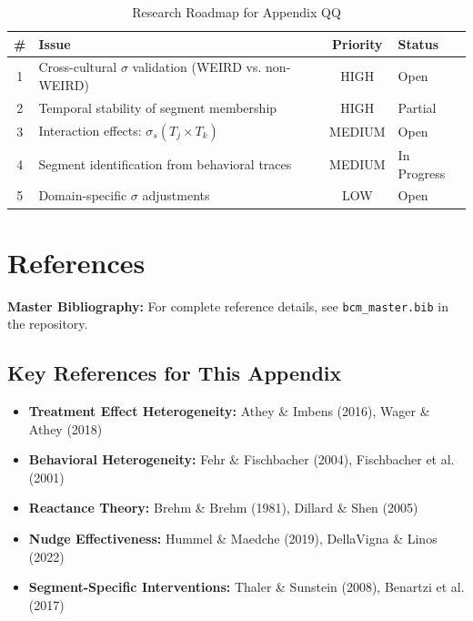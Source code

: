 \begin{table}[htbp]
\centering
\caption{Research Roadmap for Appendix QQ}
\label{tab:qq-roadmap}
\renewcommand{\arraystretch}{1.3}
\begin{tabular}{@{}clcl@{}}
\toprule
\textbf{\#} & \textbf{Issue} & \textbf{Priority} & \textbf{Status} \\
\midrule
1 & Cross-cultural $\sigma$ validation (WEIRD vs. non-WEIRD) & HIGH & Open \\
2 & Temporal stability of segment membership & HIGH & Partial \\
3 & Interaction effects: $\sigma_{s}(T_j \times T_k)$ & MEDIUM & Open \\
4 & Segment identification from behavioral traces & MEDIUM & In Progress \\
5 & Domain-specific $\sigma$ adjustments & LOW & Open \\
\bottomrule
\end{tabular}
\end{table}


\section{References}
\label{sec:qq-references}

\begin{tcolorbox}[colback=blue!5!white, colframe=blue!75!black]
\textbf{Master Bibliography:} For complete reference details, see
\texttt{bcm\_master.bib} in the repository.
\end{tcolorbox}

\vspace{0.5em}

\subsection{Key References for This Appendix}

\begin{itemize}[nosep]
    \item \textbf{Treatment Effect Heterogeneity:} Athey \& Imbens (2016), Wager \& Athey (2018)
    \item \textbf{Behavioral Heterogeneity:} Fehr \& Fischbacher (2004), Fischbacher et al. (2001)
    \item \textbf{Reactance Theory:} Brehm \& Brehm (1981), Dillard \& Shen (2005)
    \item \textbf{Nudge Effectiveness:} Hummel \& Maedche (2019), DellaVigna \& Linos (2022)
    \item \textbf{Segment-Specific Interventions:} Thaler \& Sunstein (2008), Benartzi et al. (2017)
\end{itemize}


